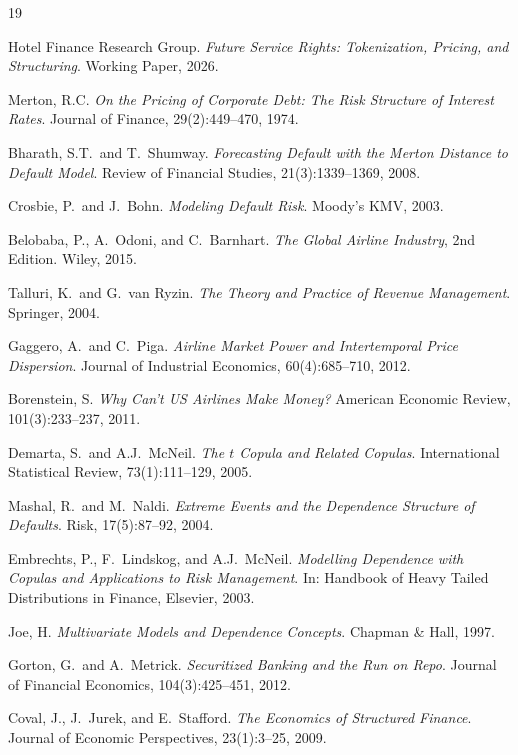 \documentclass[12pt,a4paper]{article}
\begin{document}
\begin{thebibliography}{19}

Hotel Finance Research Group.
\emph{Future Service Rights: Tokenization, Pricing, and Structuring}.
Working Paper, 2026.

Merton, R.C.
\emph{On the Pricing of Corporate Debt: The Risk Structure of Interest Rates}.
Journal of Finance, 29(2):449--470, 1974.

Bharath, S.T.\ and T.\ Shumway.
\emph{Forecasting Default with the Merton Distance to Default Model}.
Review of Financial Studies, 21(3):1339--1369, 2008.

Crosbie, P.\ and J.\ Bohn.
\emph{Modeling Default Risk}. Moody's KMV, 2003.

Belobaba, P., A.\ Odoni, and C.\ Barnhart.
\emph{The Global Airline Industry}, 2nd Edition. Wiley, 2015.

Talluri, K.\ and G.\ van Ryzin.
\emph{The Theory and Practice of Revenue Management}. Springer, 2004.

Gaggero, A.\ and C.\ Piga.
\emph{Airline Market Power and Intertemporal Price Dispersion}.
Journal of Industrial Economics, 60(4):685--710, 2012.

Borenstein, S.
\emph{Why Can't US Airlines Make Money?}
American Economic Review, 101(3):233--237, 2011.

Demarta, S.\ and A.J.\ McNeil.
\emph{The $t$ Copula and Related Copulas}.
International Statistical Review, 73(1):111--129, 2005.

Mashal, R.\ and M.\ Naldi.
\emph{Extreme Events and the Dependence Structure of Defaults}.
Risk, 17(5):87--92, 2004.

Embrechts, P., F.\ Lindskog, and A.J.\ McNeil.
\emph{Modelling Dependence with Copulas and Applications to Risk Management}.
In: Handbook of Heavy Tailed Distributions in Finance, Elsevier, 2003.

Joe, H.
\emph{Multivariate Models and Dependence Concepts}. Chapman \& Hall, 1997.

Gorton, G.\ and A.\ Metrick.
\emph{Securitized Banking and the Run on Repo}.
Journal of Financial Economics, 104(3):425--451, 2012.

Coval, J., J.\ Jurek, and E.\ Stafford.
\emph{The Economics of Structured Finance}.
Journal of Economic Perspectives, 23(1):3--25, 2009.


\end{thebibliography}
\end{document}
